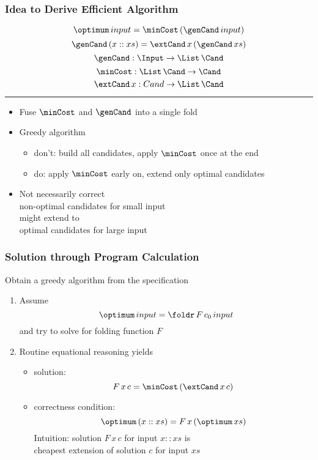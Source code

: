 \documentclass{beamer}
\def\inp{input}
\begin{document}
\begin{frame}\frametitle{Idea to Derive Efficient Algorithm}
\color{gray}
\[\optimum\,\inp = \minCost\,(\genCand\,\inp)\]
\[\genCand\, (x::xs) = \extCand\, x\,(\genCand\,xs)\]
\[\genCand: \Input\to \List\, \Cand\]
\[\minCost: \List\, \Cand \to \Cand\]
\[\extCand\,x: Cand \to \List\,\Cand\]

\hrule

\begin{itemize}
\item Fuse $\minCost$ and $\genCand$ into a single fold
\item Greedy algorithm
\begin{itemize}
\item don't: build all candidates, apply $\minCost$ once at the end
\item do: apply $\minCost$ early on, extend only optimal candidates
\end{itemize}
\item Not necessarily correct\\
   \tb non-optimal candidates for small input \\
   \tb might extend to \\
   \tb optimal candidates for large input
\end{itemize}
\end{frame}

\begin{frame}\frametitle{Solution through Program Calculation}
Obtain a greedy algorithm from the specification
\begin{enumerate}
\item Assume \[\optimum\,\inp = \foldr\, F\,c_0\,\inp\]
and try to solve for folding function $F$
\item<2-> Routine equational reasoning yields
\begin{itemize}
  \item solution:
    \[F\,x\,c = \minCost\,(\extCand\,x\,c)\]
  \item correctness condition:
    \[\optimum\,(x::xs) = F\,x\,(\optimum\,xs)\]
Intuition: solution $F\,x\,c$ for input $x::xs$ is \\ cheapest extension of solution $c$ for input $xs$
\end{itemize}
\end{enumerate}
\end{frame}
\end{document}
